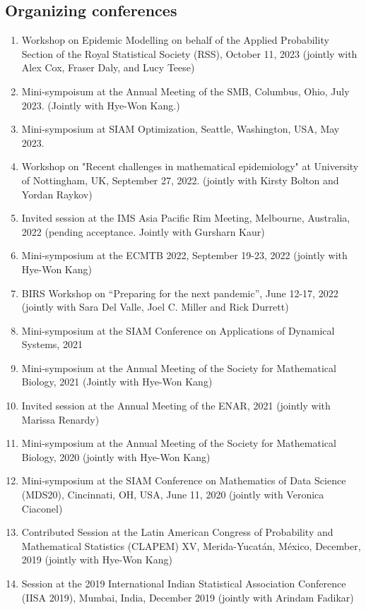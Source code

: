\documentclass[11pt,a4paper,sans]{moderncv}        %
\begin{document}
\subsection{Organizing conferences}
\begin{enumerate}
	\item Workshop on Epidemic Modelling on behalf of the Applied Probability Section of the Royal Statistical Society (RSS), October 11, 2023 (jointly with Alex Cox, Fraser Daly, and Lucy Teese)
	\item Mini-sympoisum at the Annual Meeting of the SMB, Columbus, Ohio, July 2023. (Jointly with Hye-Won Kang.)
	\item Mini-symposium at SIAM Optimization, Seattle, Washington, USA, May 2023. 
	\item Workshop on "Recent challenges in mathematical epidemiology" at University of Nottingham, UK, September 27, 2022. (jointly with Kirsty Bolton and Yordan Raykov)
	\item  {Invited session at the IMS Asia Pacific Rim Meeting, Melbourne, Australia, 2022 (pending acceptance. Jointly with Gursharn Kaur)}
	\item Mini-symposium at the ECMTB 2022, September 19-23, 2022 (jointly with Hye-Won Kang)
	\item BIRS Workshop on ``Preparing for the next pandemic'', June 12-17, 2022 (jointly with Sara Del Valle, Joel C. Miller and Rick Durrett) 
	\item Mini-symposium at the SIAM Conference on Applications of Dynamical Systems, 2021 
	\item {Mini-symposium at the Annual Meeting of the Society for Mathematical Biology, 2021 (Jointly with Hye-Won Kang)}
	\item {Invited session at the Annual Meeting of the ENAR, 2021 (jointly with Marissa Renardy)}
	\item {Mini-symposium at the Annual Meeting of the Society for Mathematical Biology, 2020 (jointly with Hye-Won Kang)}
	\item {Mini-symposium at the SIAM Conference on Mathematics of Data Science (MDS20), Cincinnati, OH, USA, June 11, 2020 (jointly with Veronica Ciaconel)  }
    \item {Contributed Session at the Latin American Congress of Probability and Mathematical Statistics (CLAPEM) XV, Merida-Yucatán, México, December, 2019 (jointly with Hye-Won Kang)}
	\item {Session at the 2019 International Indian Statistical Association Conference (IISA 2019), Mumbai, India, December 2019 (jointly with Arindam Fadikar)}
\end{enumerate}
\end{document}
